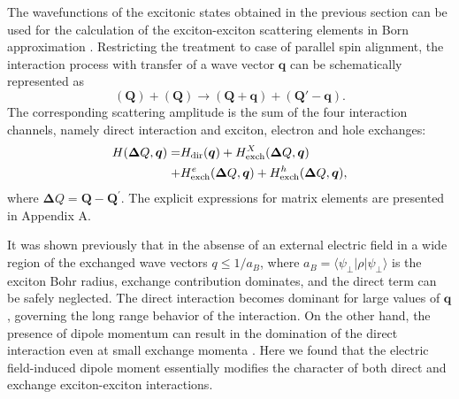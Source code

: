 \documentclass[prb,twocolumn,preprintnumbers,superscriptaddress]{revtex4}
\begin{document}
The wavefunctions of the excitonic states obtained in the previous section can be used for the calculation of the exciton-exciton scattering elements in Born approximation \cite{Ciuti1998}. Restricting the treatment to case of parallel spin alignment, the interaction process with transfer of a wave vector $\mathbf{q}$ can be schematically represented as
%
\begin{equation}
    (\mathbf{Q}) + (\mathbf{Q}) \rightarrow (\mathbf{Q}+\mathbf{q})+(\mathbf{Q}'-\mathbf{q}).
    \label{scattering}
\end{equation}
%
The corresponding scattering amplitude is the sum of the four interaction channels, namely direct interaction and exciton, electron and hole exchanges:
%
\begin{eqnarray}
    H( {\bm \Delta Q}, {\bm q})= &H_{{\rm dir}} ( {\bm q}) 
    +H^X_{{\rm exch}} ({\bm \Delta Q}, {\bm q}) \notag\\ 
    +&H^e_{{\rm exch}} ({\bm \Delta Q}, {\bm q})
    +H^h_{{\rm exch}} ({\bm \Delta Q}, {\bm q}),
\end{eqnarray}
%
where ${\bm \Delta Q} = {\bm Q} - {\bm Q}^\prime$. 
The explicit expressions for matrix elements are presented in Appendix A.

It was shown previously \cite{Ciuti1998,Tassone1999,Shahnazaryan2016, Shahnazaryan2017} that in the absense of an external electric field in a wide region of the exchanged wave vectors $q\leq 1/a_B$, where $a_B = \langle \psi_{\perp}|\rho|\psi_{\perp}\rangle$ is the exciton Bohr radius, exchange contribution dominates, and the direct term can be safely neglected. 
The direct interaction  becomes dominant for large values of $\textbf{q}$, governing the long range behavior of the interaction. 
On the other hand, the presence of dipole momentum can result in the domination of the direct interaction even at small exchange momenta \cite{Kyriienko2012}.
Here we found that the electric field-induced dipole moment essentially modifies the character of both direct and exchange exciton-exciton interactions.
\end{document}
